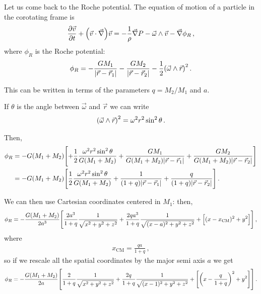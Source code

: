 \documentclass[main.tex]{subfiles}
\begin{document}

Let us come back to the Roche potential. 
The equation of motion of a particle in the corotating frame is 
%
\begin{align}
\pdv{\vec{v}}{t} 
+ \qty(\vec{v} \cdot \vec{\nabla}) \vec{v}
= - \frac{1}{\rho } \vec{\nabla} P 
- \vec{\omega} \wedge \vec{v}
- \vec{\nabla} \phi _R
\,,
\end{align}
%
where \(\phi _R\) is the Roche potential: 
%
\begin{align}
\phi _R = - \frac{GM_1}{\abs{\vec{r} - \vec{r}_1}}
- \frac{GM_2}{\abs{\vec{r} - \vec{r}_2}}
- \frac{1}{2} \qty(\vec{\omega} \wedge \vec{r})^2
\,.
\end{align}


This can be written in terms of the parameters \(q = M_2 / M_1 \) and \(a\).

If \(\theta \) is the angle between \(\vec{\omega}\) and \(\vec{r}\) we can write 
%
\begin{align}
\qty(\vec{\omega} \wedge \vec{r})^2 = \omega^2 r^2 \sin^2 \theta 
\,.
\end{align}

Then, 
%
\begin{align}
\phi _R &=  
- G (M_1 + M_2 ) \qty[ + \frac{1}{2} \frac{\omega^2 r^2 \sin^2\theta }{G (M_1 + M_2 )}
+ \frac{GM_1 }{G (M_1 + M_2 ) \abs{\vec{r} - \vec{r}_1 }}
+ \frac{GM_2 }{G (M_1 + M_2 ) \abs{\vec{r} - \vec{r}_2 }}
 ]  \\
 &= - G (M_1 + M_2 )
 \qty[
     \frac{1}{2} \frac{\omega^2r^2 \sin^2\theta }{G(M_1 + M_2 )} 
     + \frac{1}{(1 + q) \abs{\vec{r} - \vec{r}_1}}
     + \frac{q}{(1 + q) \abs{\vec{r} - \vec{r}_2}}
 ]
\,.
\end{align}

We can then use Cartesian coordinates centered in \(M_1 \): 
then, 
%
\begin{align}
\phi _R = - \frac{G (M_1 + M_2  )}{2 a^3}
\qty[ \frac{2 a^3}{1 + q}
\frac{1}{\sqrt{x^2 +y^2 +z^2}}
+
\frac{2 q a^3}{1 + q} 
\frac{1}{\sqrt{(x-a)^2 + y^2 +z^2}}
+ \qty[(x - x _{\text{CM}})^2 + y^2]
]
\,,
\end{align}
%
where 
%
\begin{align}
x _{\text{CM}} = \frac{qa}{1 + q}
\,,
\end{align}
%
so if we rescale all the spatial coordinates by the major semi axis \(a\) we get 
%
\begin{align}
\phi _R = - \frac{G (M_1 + M_2 )}{2a}
\qty[
\frac{2}{1 +q}
\frac{1}{\sqrt{x^2 +y^2 +z^2}} 
+
\frac{2 q}{1 + q} 
\frac{1}{\sqrt{(x-1)^2 + y^2 + z^2}}
+ \qty[\qty(x - \frac{q}{1 + q})^2 + y^2]
]
\,.
\end{align}
\end{document}
